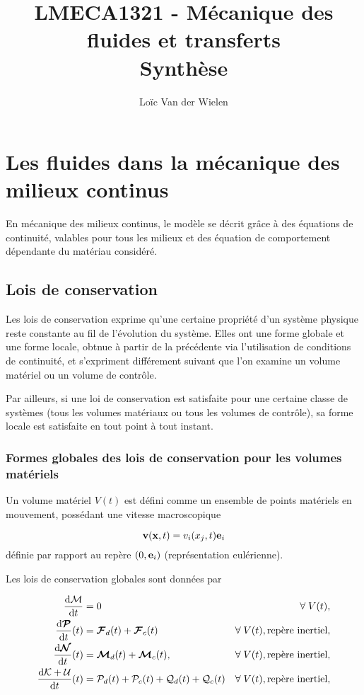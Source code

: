 \documentclass[a4paper,11pt]{report}
\title{LMECA1321 - Mécanique des fluides et transferts\\Synthèse}
\author{Loïc Van der Wielen}
\begin{document}
\maketitle
\tableofcontents



\chapter{Les fluides dans la mécanique des milieux continus}
  En mécanique des milieux continus, le modèle se décrit grâce à des équations de continuité, valables pour tous les milieux et des équation de comportement dépendante du matériau considéré.

  \section{Lois de conservation}
    Les lois de conservation exprime qu'une certaine propriété d'un système physique reste constante au fil de l'évolution du système. Elles ont une forme globale et une forme locale, obtnue à partir de la précédente via l'utilisation de conditions de continuité, et s'expriment différement suivant que l'on examine un volume matériel ou un volume de contrôle.

    Par ailleurs, si une loi de conservation est satisfaite pour une certaine classe de systèmes (tous les volumes matériaux ou tous les volumes de contrôle), sa forme locale est satisfaite en tout point à tout instant.

    \subsection{Formes globales des lois de conservation pour les volumes matériels}
      Un volume matériel $V(t)$ est défini comme un ensemble de points matériels en mouvement, possédant une vitesse macroscopique

      \begin{equation}
        \vb{v}(\vb{x}, t) = v_i(x_j, t)\vb{e}_i
      \end{equation}
      définie par rapport au repère $(0, \vb{e}_i)$ (représentation eulérienne).

      Les lois de conservation globales sont données par

      \begin{gather}\begin{aligned}
        \dv{\mathcal{M}}{t} &= 0 & \forall \; V(t),\\
        \dv{\boldsymbol{\mathcal{P}}}{t} {}(t) &= \boldsymbol{\mathcal{F}}_d(t) + \boldsymbol{\mathcal{F}}_c(t) & \forall \; V(t), \textrm{repère inertiel},\\
        \dv{\boldsymbol{\mathcal{N}}}{t} {}(t) &= \boldsymbol{\mathcal{M}}_d(t) + \boldsymbol{\mathcal{M}}_c(t), & \forall \; V(t), \textrm{repère inertiel}, \\
        \dv{\mathcal{K} + \mathcal{U}}{t} {}(t) &= \mathcal{P}_d(t) + \mathcal{P}_c(t) + \mathcal{Q}_d(t) + \mathcal{Q}_c(t) & \forall \; V(t), \textrm{repère inertiel},
      \end{aligned}\end{gather}
\end{document}
